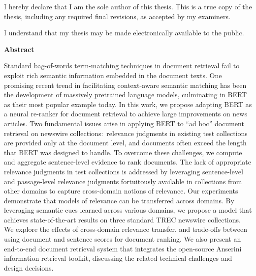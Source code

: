\cleardoublepage

  \noindent
I hereby declare that I am the sole author of this thesis. This is a true copy of the thesis, including any required final revisions, as accepted by my examiners.

  \bigskip
  
  \noindent
I understand that my thesis may be made electronically available to the public.

\cleardoublepage


\begin{center}\textbf{Abstract}\end{center}
Standard bag-of-words term-matching techniques in document retrieval fail to exploit rich semantic information embedded in the document texts.
One promising recent trend in facilitating context-aware semantic matching has been the development of massively pretrained language models, culminating in BERT as their most popular example today.
In this work, we propose adapting BERT as a neural re-ranker for document retrieval to achieve large improvements on news articles.
Two fundamental issues arise in applying BERT to ``ad hoc'' document retrieval on newswire collections:\
relevance judgments in existing test collections are provided only at the document level, and documents often exceed the length that BERT was designed to handle.
To overcome these challenges, we compute and aggregate sentence-level evidence to rank documents.
The lack of appropriate relevance judgments in test collections is addressed by leveraging sentence-level and passage-level relevance judgments fortuitously available in collections from other domains to capture cross-domain notions of relevance.
Our experiments demonstrate that models of relevance can be transferred across domains.
By leveraging semantic cues learned across various domains, we propose a model that achieves state-of-the-art results on three standard TREC newswire collections.
We explore the effects of cross-domain relevance transfer, and trade-offs between using document and sentence scores for document ranking.
We also present an end-to-end document retrieval system that integrates the open-source Anserini information retrieval toolkit, discussing the related technical challenges and design decisions.

